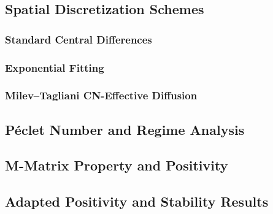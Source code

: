 \documentclass[11pt]{article}
\theoremstyle{definition}
\theoremstyle{remark}
\begin{document}

\subsection{Spatial Discretization Schemes}
\label{sec:schemes}


\subsubsection{Standard Central Differences}
\label{sec:sc}

\subsubsection{Exponential Fitting}
\label{sec:ef}

\subsubsection{Milev--Tagliani CN-Effective Diffusion}
\label{sec:mt}

\subsection{P\'eclet Number and Regime Analysis}
\label{sec:peclet}


\subsection{M-Matrix Property and Positivity}
\label{sec:mmatrix}


\subsection{Adapted Positivity and Stability Results}
\label{sec:theorems}


\end{document}
